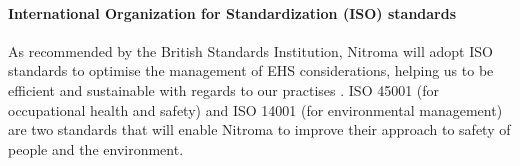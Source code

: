\paragraph{International Organization for
Standardization (ISO) standards}

As recommended by the British Standards Institution, Nitroma will adopt ISO standards to optimise the management of EHS considerations, helping us to be efficient and sustainable with regards to our practises \cite{british_standards_institution_benefits_nodate}. ISO 45001 (for occupational health and safety) and ISO 14001 (for environmental management) are two standards that will enable Nitroma to improve their approach to safety of people and the environment. 
